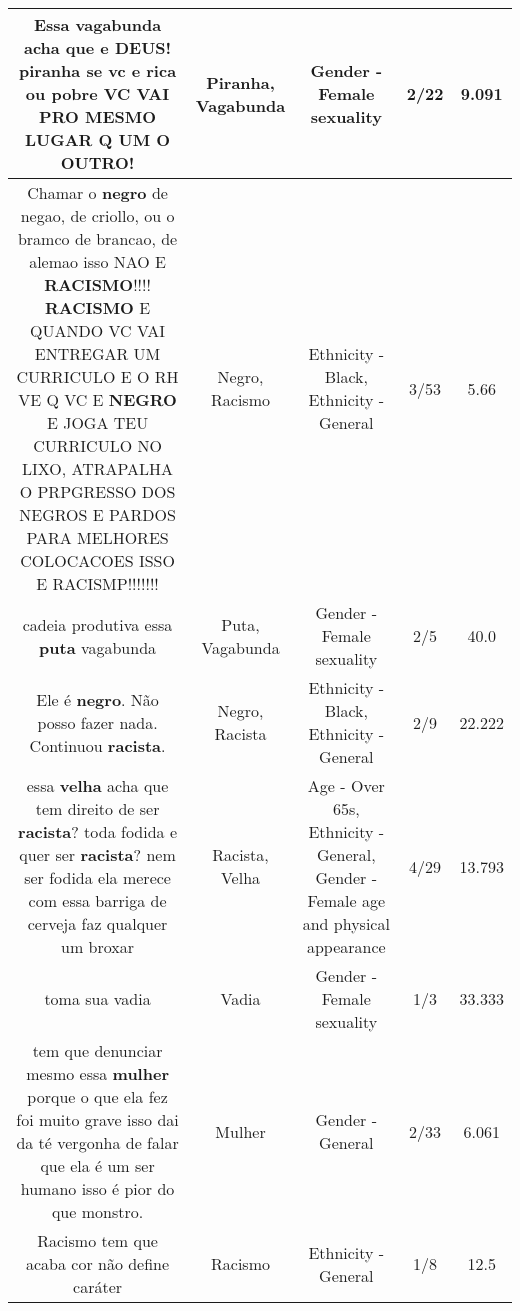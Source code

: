 \documentclass[11pt]{article}
\newlength\mylength
\begin{document}
\begin{center}
\begin{longtable}{|C{.65\mylength}|C{.30\mylength}|C{.12\mylength}|C{.12\mylength}|C{.12\mylength}|}
  \small Essa \textbf{vagabunda} acha que e DEUS! \textbf{piranha} se vc e rica ou pobre VC VAI PRO MESMO LUGAR Q UM O OUTRO!\normalsize   & Piranha, Vagabunda & Gender - Female sexuality & 2/22 & 9.091 \\  \hline
  \small Chamar o \textbf{negro} de negao, de criollo, ou o bramco de brancao, de alemao isso NAO E \textbf{RACISMO}!!!! \textbf{RACISMO} E QUANDO VC VAI ENTREGAR UM CURRICULO E O RH VE Q VC E \textbf{NEGRO} E JOGA TEU CURRICULO NO LIXO, ATRAPALHA O PRPGRESSO DOS NEGROS E PARDOS PARA MELHORES COLOCACOES ISSO E RACISMP!!!!!!!\normalsize   & Negro, Racismo & Ethnicity - Black, Ethnicity - General & 3/53 & 5.66 \\  \hline
  \small cadeia produtiva essa \textbf{puta} vagabunda\normalsize   & Puta, Vagabunda & Gender - Female sexuality & 2/5 & 40.0 \\  \hline
  \small Ele é \textbf{negro}. Não posso fazer nada. Continuou \textbf{racista}.\normalsize   & Negro, Racista & Ethnicity - Black, Ethnicity - General & 2/9 & 22.222 \\  \hline
  \small essa \textbf{v\textbf{elha}} acha que tem direito de ser \textbf{racista}? toda fodida e quer ser \textbf{racista}? nem ser fodida ela  merece com essa barriga de cerveja faz qualquer um broxar\normalsize   & Racista, Velha & Age - Over 65s, Ethnicity - General, Gender - Female age and physical appearance & 4/29 & 13.793 \\  \hline
  \small toma sua vadia\normalsize   & Vadia & Gender - Female sexuality & 1/3 & 33.333 \\  \hline
  \small tem que denunciar mesmo essa \textbf{mulher} porque o que ela fez foi muito grave isso dai da té vergonha de falar que ela é um ser humano isso é pior do que monstro.\normalsize   & Mulher & Gender - General & 2/33 & 6.061 \\  \hline
  \small Racismo tem que acaba cor não define caráter\normalsize   & Racismo & Ethnicity - General & 1/8 & 12.5 \\  \hline

\end{longtable}
\end{center}
\end{document}

